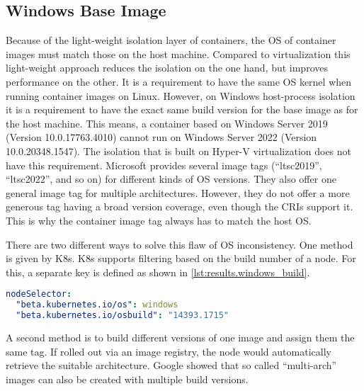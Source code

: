 \subsection{Windows Base Image}
Because of the light-weight isolation layer of containers, the \ac{OS} of container images must match those on the host machine. Compared to virtualization this light-weight approach reduces the isolation on the one hand, but improves performance on the other.
It is a requirement to have the same \ac{OS} kernel when running container images on Linux. However, on \ac{Windows} host-process isolation it is a requirement to have the exact same build version for the base image as for the host machine. This means, a container based on Windows Server 2019 (Version 10.0.17763.4010) cannot run on Windows Server 2022 (Version 10.0.20348.1547).
The isolation that is built on Hyper-V virtualization does not have this requirement. 
Microsoft provides several image tags (\enquote{ltsc2019}, \enquote{ltsc2022}, and so on) for different kinds of \ac{OS} versions\cite{MattbriggsMicrosoft.20230214,Microsoft.20230313}. They also offer one general image tag for multiple architectures\cite{Microsoft.20230313}. However, they do not offer a more generous tag having a broad version coverage, even though the \acp{CRI} support it. This is why the container image tag always has to match the host \ac{OS}.

There are two different ways to solve this flaw of \ac{OS} inconsistency. One method is given by \ac{K8s}. \ac{K8s} supports filtering based on the build number of a node\cite{Brasmithms.20230313}. For this, a separate  key is defined as shown in \autoref{lst:results.windows_build}.
\begin{lstlisting}[caption={\ac{K8s} manifest with node selector for specific Windows build.}, label=lst:results.windows_build, language=yaml]
nodeSelector:
  "beta.kubernetes.io/os": windows
  "beta.kubernetes.io/osbuild": "14393.1715"
\end{lstlisting}
A second method is to build different versions of one image and assign them the same tag. If rolled out via an image registry, the node would automatically retrieve the suitable architecture. Google showed that so called \enquote{multi-arch} images can also be created with multiple build versions\cite{Google.20230313}.


